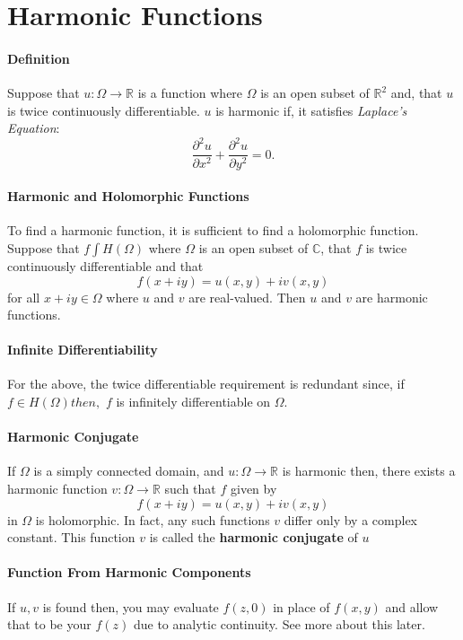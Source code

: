 \documentclass[12pt, letterpaper]{article}
\begin{document}
    \section{Harmonic Functions}
    \paragraph{Definition}
    Suppose that \(u: \Omega \to \mathbb{R}\) is a function where \(\Omega\)
    is an open subset of \(\mathbb{R}^2\) and, that \(u\) is twice continuously 
    differentiable. \(u\) is harmonic if, it satisfies \textit{Laplace's Equation}:    
    \[
        \frac{\partial^2 u}{\partial x^2} +  \frac{\partial^2 u}{\partial y^2}
        = 0.
    \]

    \paragraph{Harmonic and Holomorphic Functions} To find a harmonic function,
    it is sufficient to find a holomorphic function.
    Suppose that \(f\int H(\Omega)\) where \(\Omega\) is an open subset of 
    \(\mathbb{C}\), that \(f\) is twice continuously differentiable and that
    \[f(x + iy) = u(x, y) + iv(x, y)\]
    for all \(x+iy\in\Omega\) where \(u\) and \(v\) are real-valued.
    Then \(u\) and \(v\) are harmonic functions.

    \paragraph{Infinite Differentiability}
    For the above, the twice differentiable requirement is redundant since, if 
    \(f\in H(\Omega) then,\) \(f\) is infinitely differentiable on \(\Omega\).
    
    \paragraph{Harmonic Conjugate}
    If \(\Omega\) is a simply connected domain, and \(u: \Omega \to \mathbb{R}\)
    is harmonic then, there exists a harmonic function \(v: \Omega \to \mathbb{R}\)
    such that \(f\) given by 
    \[
        f(x + iy) = u(x,y) + iv(x,y)
    \] in \(\Omega\) is holomorphic. In fact, any such functions \(v\)
    differ only by a complex constant.
    This function \(v\) is called the \textbf{harmonic conjugate} of \(u\)

    \paragraph{Function From Harmonic Components}
    If \(u, v\) is found then, you may evaluate \(f(z, 0)\) in place of 
    \(f(x, y)\) and allow that to be your \(f(z)\) due to analytic continuity.
    See more about this later.
    
\end{document}
